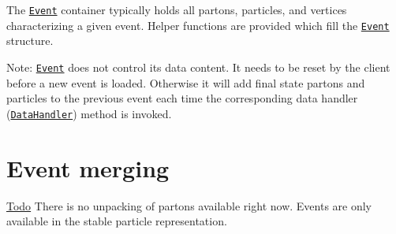 The {\tt \hyperlink{classEvent}{Event}} container typically holds all partons, particles, and vertices characterizing a given event. Helper functions are provided which fill the {\tt \hyperlink{classEvent}{Event}} structure.

\begin{Desc}
\item[Note:]{\tt \hyperlink{classEvent}{Event}} does not control its data content. It needs to be reset by the client before a new event is loaded. Otherwise it will add final state partons and particles to the previous event each time the corresponding data handler ({\tt \hyperlink{structDataHandler}{Data\-Handler}}) method is invoked.\end{Desc}
\hypertarget{index_merging_strategy}{}\section{Event merging}\label{index_merging_strategy}
\begin{Desc}
\item[\hyperlink{todo__todo000004}{Todo}]There is no unpacking of partons available right now. Events are only available in the stable particle representation. \end{Desc}
